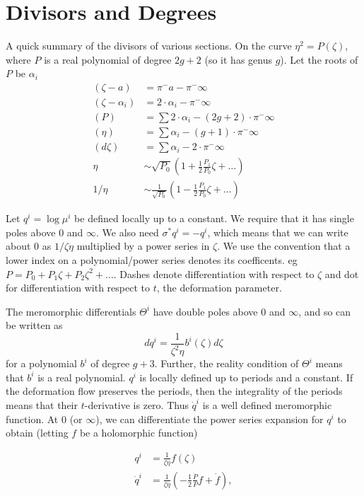 \documentclass{article}
\begin{document}
\section{Divisors and Degrees} %
\label{sec:divisors}
A quick summary of the divisors of various sections. On the curve $\eta^2 = P(\zeta)$, where $P$ is a real polynomial of degree $2g+2$ (so it has genus $g$). Let the roots of $P$ be $\alpha_i$
\begin{align*}
(\zeta - a) &= \pi^-a - \pi^-\infty \\
(\zeta - \alpha_i) &= 2\cdot\alpha_i - \pi^-\infty \\
(P) &= \sum 2\cdot\alpha_i - (2g+2)\cdot\pi^-\infty \\
(\eta) &= \sum \alpha_i - (g+1)\cdot\pi^-\infty \\
(d\zeta) &= \sum \alpha_i - 2\cdot\pi^-\infty \\
\eta &\sim \sqrt{P_0}\left(1 + \frac{1}{2}\frac{P_1}{P_0}\zeta + \dots\right)\\
1/\eta &\sim \frac{1}{\sqrt{P_0}}\left(1 - \frac{1}{2}\frac{P_1}{P_0}\zeta + \dots\right)
\end{align*}

Let $q^i = \log \mu^i$ be defined locally up to a constant. We require that it has single poles above $0$ and $\infty$. We also need $\sigma^* q^i = - q^i$, which means that we can write about $0$ as $1/\zeta\eta$ multiplied by a power series in $\zeta$. We use the convention that a lower index on a polynomial/power series denotes its coefficents. eg $P = P_0 + P_1\zeta + P_2\zeta^2 + \dots$. Dashes denote differentiation with respect to $\zeta$ and dot for differentiation with respect to $t$, the deformation parameter.

The meromorphic differentials $\Theta^i$ have double poles above $0$ and $\infty$, and so can be written as
\[
dq^i = \frac{1}{\zeta^2\eta}b^i(\zeta) d\zeta
\]
for a polynomial $b^i$ of degree $g+3$. Further, the reality condition of $\Theta^i$ means that $b^i$ is a real polynomial. $q^i$ is locally defined up to periods and a constant. If the deformation flow preserves the periods, then the integrality of the periods means that their $t$-derivative is zero. Thus $\dot q^i$ is a well defined meromorphic function. At $0$ (or $\infty$), we can differentiate the power series expansion for $q^i$ to obtain (letting $f$ be a holomorphic function)

\begin{align*}
q^i &= \frac{1}{\zeta\eta}f(\zeta) \\
\dot q^i &= \frac{1}{\zeta\eta} \left(-\frac{1}{2}\frac{\dot P}{P}f + \dot f\right),
\end{align*}
\end{document}
